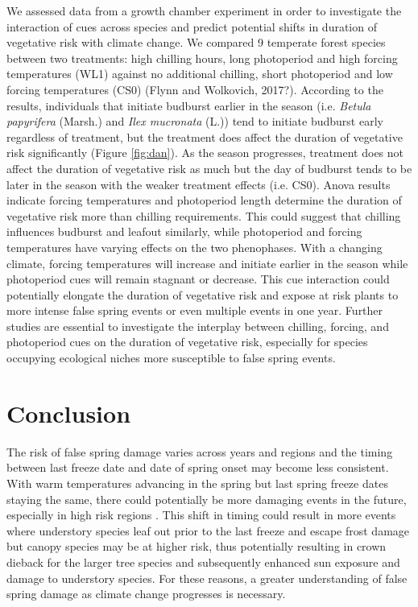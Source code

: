 \documentclass{article}\usepackage[]{graphicx}\usepackage[]{color}
\begin{document}
We assessed data from a growth chamber experiment in order to investigate the interaction of cues across species and predict potential shifts in duration of vegetative risk with climate change. We compared 9 temperate forest species between two treatments: high chilling hours, long photoperiod and high forcing temperatures (WL1) against no additional chilling, short photoperiod and low forcing temperatures (CS0) (Flynn and Wolkovich, 2017?). According to the results, individuals that initiate budburst earlier in the season (i.e. {\textit {Betula papyrifera}} (Marsh.) and {\textit{Ilex mucronata}} (L.)) tend to initiate budburst early regardless of treatment, but the treatment does affect the duration of vegetative risk significantly (Figure \ref{fig:dan}). As the season progresses, treatment does not affect the duration of vegetative risk as much but the day of budburst tends to be later in the season with the weaker treatment effects (i.e. CS0). Anova results indicate forcing temperatures and photoperiod length determine the duration of vegetative risk more than chilling requirements. This could suggest that chilling influences budburst and leafout similarly, while photoperiod and forcing temperatures have varying effects on the two phenophases. With a changing climate, forcing temperatures will increase and initiate earlier in the season while photoperiod cues will remain stagnant or decrease. This cue interaction could potentially elongate the duration of vegetative risk and expose at risk plants to more intense false spring events or even multiple events in one year. Further studies are essential to investigate the interplay between chilling, forcing, and photoperiod cues on the duration of vegetative risk, especially for species occupying ecological niches more susceptible to false spring events. 

\section{Conclusion}
The risk of false spring damage varies across years and regions and the timing between last freeze date and date of spring onset may become less consistent. With warm temperatures advancing in the spring but last spring freeze dates staying the same, there could potentially be more damaging events in the future, especially in high risk regions \citep{Gu2008, Inouye2008}. This shift in timing could result in more events where understory species leaf out prior to the last freeze and escape frost damage but canopy species may be at higher risk, thus potentially resulting in crown dieback for the larger tree species and subsequently enhanced sun exposure and damage to understory species. For these reasons, a greater understanding of false spring damage as climate change progresses is necessary.
\end{document}
